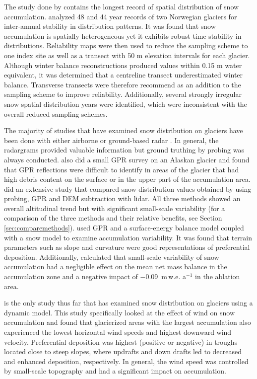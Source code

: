 \documentclass{sfuthesis}
\begin{document}
The study done by \cite{Walmsley2015} contains the longest record of spatial distribution of snow accumulation. \cite{Walmsley2015} analyzed 48 and 44 year records of two Norwegian glaciers for inter-annual stability in distribution patterns. It was found that snow accumulation is spatially heterogeneous yet it exhibits robust time stability in distributions. Reliability maps were then used to reduce the sampling scheme to one index site as well as a transect with 50 m elevation intervals for each glacier. Although winter balance reconstructions produced values within 0.15 m water equivalent, it was determined that a centreline transect underestimated winter balance. Transverse transects were therefore recommend as an addition to the sampling scheme to improve reliability. Additionally, several strongly irregular snow spatial distribution years were identified, which were inconsistent with the overall reduced sampling schemes. 

The majority of studies that have examined snow distribution on glaciers have been done with either airborne or ground-based radar \citep[e.g.][]{Winther1998,Machguth2006, Grabiec2011, Pelt2014,McGrath2015}. In general, the radargrams provided valuable information but ground truthing by probing was always conducted. \cite{Gusmeroli2014} also did a small GPR survey on an Alaskan glacier and found that GPR reflections were difficult to identify in areas of the glacier that had high debris content on the surface or in the upper part of the accumulation area. \cite{Sold2013} did an extensive study that compared snow distribution values obtained by using probing, GPR and DEM subtraction with lidar. All three methods showed an overall altitudinal trend but with significant small-scale variability (for a comparison of the three methods and their relative benefits, see Section \ref{sec:comparemethods}). \cite{Pelt2014} used GPR and a surface-energy balance model coupled with a snow model to examine accumulation variability. It was found that terrain parameters such as slope and curvature were good representations of preferential deposition. Additionally, \cite{Pelt2014} calculated that small-scale variability of snow accumulation had a negligible effect on the mean net mass balance in the accumulation zone and a negative impact of $-$0.09 \,m\,w.e. a$^{-1}$ in the ablation area.

\cite{Dadic2010} is the only study thus far that has examined snow distribution on glaciers using a dynamic model. This study specifically looked at the effect of wind on snow accumulation and found that glacierized areas with the largest accumulation also experienced the lowest horizontal wind speeds and highest downward wind velocity. Preferential deposition was highest (positive or negative) in troughs located close to steep slopes, where updrafts and down drafts led to decreased and enhanced deposition, respectively. In general, the wind speed was controlled by small-scale topography and had a significant impact on accumulation. 
\end{document}
